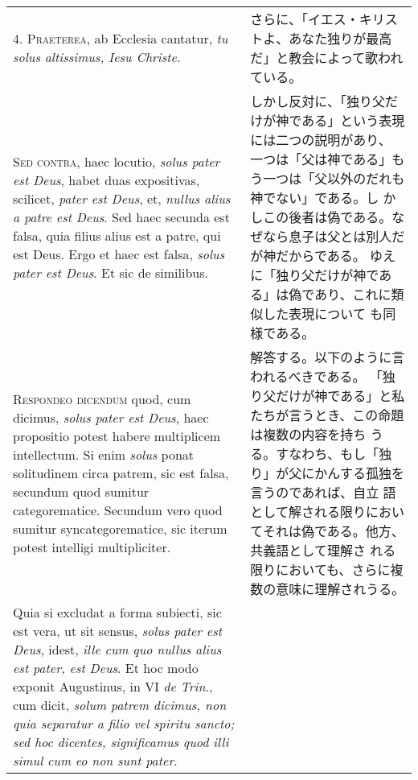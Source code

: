 \documentclass[10pt]{jsarticle} %
\begin{document}
\begin{longtable}{p{21em}p{21em}}
\\



4. {\scshape Praeterea}, ab Ecclesia cantatur, {\itshape tu solus altissimus, Iesu Christe}.

&

さらに、「イエス・キリストよ、あなた独りが最高だ」と教会によって歌われ
 ている。

\\


{\scshape Sed contra}, haec locutio, {\itshape solus pater est Deus}, habet duas
expositivas, scilicet, {\itshape pater est Deus}, et, {\itshape nullus alius a patre est
Deus}. Sed haec secunda est falsa, quia filius alius est a patre, qui
est Deus. Ergo et haec est falsa, {\itshape solus pater est Deus}. Et sic de
similibus.

&

しかし反対に、「独り父だけが神である」という表現には二つの説明があり、
 一つは「父は神である」もう一つは「父以外のだれも神でない」である。し
 かしこの後者は偽である。なぜなら息子は父とは別人だが神だからである。
 ゆえに「独り父だけが神である」は偽であり、これに類似した表現について
 も同様である。


\\



{\scshape Respondeo dicendum} quod, cum dicimus, {\itshape solus pater est Deus}, haec
propositio potest habere multiplicem intellectum. Si enim {\itshape solus} ponat
solitudinem circa patrem, sic est falsa, secundum quod sumitur
categorematice. Secundum vero quod sumitur syncategorematice, sic
iterum potest intelligi multipliciter. 


&

解答する。以下のように言われるべきである。
「独り父だけが神である」と私たちが言うとき、この命題は複数の内容を持ち
 うる。すなわち、もし「独り」が父にかんする孤独を言うのであれば、自立
 語として解される限りにおいてそれは偽である。他方、共義語として理解さ
 れる限りにおいても、さらに複数の意味に理解されうる。

\\

Quia si excludat a forma
subiecti, sic est vera, ut sit sensus, {\itshape solus pater est Deus}, idest,
{\itshape ille cum quo nullus alius est pater, est Deus}. Et hoc modo exponit
Augustinus, in VI {\itshape de Trin}., cum dicit, {\itshape solum patrem dicimus, non quia
separatur a filio vel spiritu sancto; sed hoc dicentes, significamus
quod illi simul cum eo non sunt pater}. 


\end{longtable}
\end{document}
